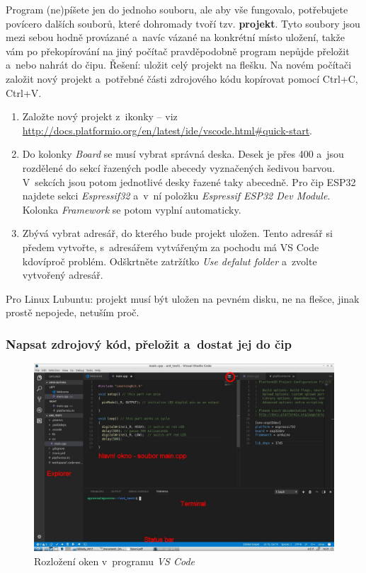 Program (ne)píšete jen do jednoho souboru, ale aby vše fungovalo, potřebujete povícero dalších souborů, které dohromady tvoří tzv. {\bf projekt}.
Tyto soubory jsou mezi sebou hodně provázané a~navíc vázané na konkrétní místo uložení, 
takže vám po překopírování na jiný počítač pravděpodobně program nepůjde přeložit a~nebo 
nahrát do čipu. Řešení: uložit celý projekt na flešku. 
Na novém počítači založit nový projekt a~potřebné části zdrojového kódu kopírovat pomocí Ctrl+C, Ctrl+V. 

\begin{enumerate}
\item  Založte nový projekt z~ikonky  -- viz \url{http://docs.platformio.org/en/latest/ide/vscode.html\#quick-start}.
\item  Do kolonky {\it Board} se musí vybrat správná deska.
Desek je přes 400 a~jsou rozdělené do sekcí řazených podle abecedy vyznačených šedivou barvou.
V~sekcích jsou potom jednotlivé desky řazené taky abecedně.
Pro čip ESP32 najdete sekci {\it Espressif32} a~v~ní položku {\it Espressif ESP32 Dev Module}.
Kolonka {\it Framework } se potom vyplní automaticky. 
\item  Zbývá vybrat adresář, do kterého bude projekt uložen.
Tento adresář si předem vytvořte, s~adresářem vytvářeným za pochodu má VS Code kdovíproč problém.
Odškrtněte zatržítko {\it Use defalut folder} a~zvolte vytvořený adresář.  
\end{enumerate}

Pro Linux Lubuntu: projekt musí být uložen na pevném disku, ne na flešce, jinak prostě nepojede, netuším proč.  

\subsubsection{Napsat zdrojový kód, přeložit a~dostat jej do čip}

\begin{figure}[h]
	\includegraphics[width=\textwidth]{soubory/rozlozeni2.jpg}
	\caption{Rozložení oken v~programu {\it VS Code}} 
	\label{fig:vsc_rozlozeni}
\end{figure}	

